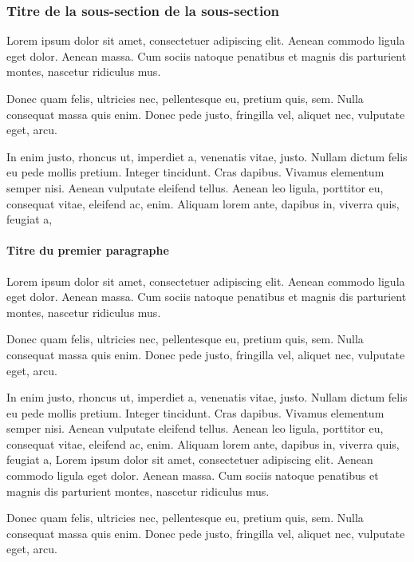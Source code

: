 \documentclass[a4paper,12 pt,twoside]{report}
\begin{document}
\subsubsection {Titre de la sous-section de la sous-section}

Lorem ipsum dolor sit amet, consectetuer adipiscing elit. Aenean
commodo ligula eget dolor. Aenean massa. Cum sociis natoque
penatibus et magnis dis parturient montes, nascetur ridiculus mus.

Donec quam felis, ultricies nec, pellentesque eu, pretium quis, sem.
Nulla consequat massa quis enim. Donec pede justo, fringilla vel,
aliquet nec, vulputate eget, arcu.

In enim justo, rhoncus ut, imperdiet a, venenatis vitae, justo.
Nullam dictum felis eu pede mollis pretium. Integer tincidunt. Cras
dapibus. Vivamus elementum semper nisi. Aenean vulputate eleifend
tellus. Aenean leo ligula, porttitor eu, consequat vitae, eleifend
ac, enim. Aliquam lorem ante, dapibus in, viverra quis, feugiat a,

\paragraph {Titre du premier paragraphe} \par

Lorem ipsum dolor sit amet, consectetuer adipiscing elit. Aenean
commodo ligula eget dolor. Aenean massa. Cum sociis natoque
penatibus et magnis dis parturient montes, nascetur ridiculus mus.

Donec quam felis, ultricies nec, pellentesque eu, pretium quis, sem.
Nulla consequat massa quis enim. Donec pede justo, fringilla vel,
aliquet nec, vulputate eget, arcu.

In enim justo, rhoncus ut, imperdiet a, venenatis vitae, justo.
Nullam dictum felis eu pede mollis pretium. Integer tincidunt. Cras
dapibus. Vivamus elementum semper nisi. Aenean vulputate eleifend
tellus. Aenean leo ligula, porttitor eu, consequat vitae, eleifend
ac, enim. Aliquam lorem ante, dapibus in, viverra quis, feugiat a,
Lorem ipsum dolor sit amet, consectetuer adipiscing elit. Aenean
commodo ligula eget dolor. Aenean massa. Cum sociis natoque
penatibus et magnis dis parturient montes, nascetur ridiculus mus.

Donec quam felis,\cite{lecun2015deep} ultricies nec, pellentesque eu, pretium
quis, sem. Nulla consequat massa quis enim. Donec pede justo,
fringilla vel, aliquet nec, vulputate eget, arcu.
\end{document}
